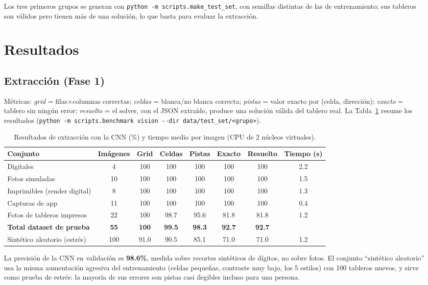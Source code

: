 \documentclass[conference,a4paper]{IEEEtran}
\begin{document}
Los tres primeros grupos se generan con \texttt{python -m scripts.make\_test\_set}, con semillas distintas de las de entrenamiento;
sus tableros son válidos pero tienen más de una solución, lo que basta para evaluar la extracción.

\section{Resultados}\label{sec:res}
\subsection{Extracción (Fase 1)}
Métricas: \emph{grid} = filas$\times$columnas correctas; \emph{celdas} = blanca/no blanca correcta;
\emph{pistas} = valor exacto por (celda, dirección); \emph{exacto} = tablero sin ningún error;
\emph{resuelto} = el solver, con el JSON extraído, produce una solución válida del tablero real.
La Tabla~\ref{tab:vision} resume los resultados (\texttt{python -m scripts.benchmark vision -{}-dir data/test\_set/<grupo>}).

\begin{table}[!t]
\centering
\caption{Resultados de extracción con la CNN (\%) y tiempo medio por imagen (CPU de 2 núcleos virtuales).}
\label{tab:vision}
\begin{tabular}{lccccccc}
\toprule
Conjunto & Imágenes & Grid & Celdas & Pistas & Exacto & Resuelto & Tiempo (s)\\
\midrule
Digitales & 4 & 100 & 100 & 100 & 100 & 100 & 2.2\\
Fotos simuladas & 10 & 100 & 100 & 100 & 100 & 100 & 1.5\\
Imprimibles (render digital) & 8 & 100 & 100 & 100 & 100 & 100 & 1.3\\
Capturas de app & 11 & 100 & 100 & 100 & 100 & 100 & 0.4\\
Fotos de tableros impresos & 22 & 100 & 98.7 & 95.6 & 81.8 & 81.8 & 1.2\\
\midrule
\textbf{Total dataset de prueba} & \textbf{55} & \textbf{100} & \textbf{99.5} & \textbf{98.3} & \textbf{92.7} & \textbf{92.7} & \\
\midrule
Sintético aleatorio (estrés) & 100 & 91.0 & 90.5 & 85.1 & 71.0 & 71.0 & 1.2\\
\bottomrule
\end{tabular}
\end{table}

\noindent La precisión de la CNN en validación es \textbf{98.6\%}, medida sobre recortes sintéticos de dígitos, no sobre fotos. El conjunto
``sintético aleatorio'' usa la misma aumentación agresiva del entrenamiento (celdas pequeñas, contraste muy bajo, los 5 estilos) con
100 tableros nuevos, y sirve como prueba de estrés: la mayoría de sus errores son pistas casi ilegibles incluso para una persona.
\end{document}

